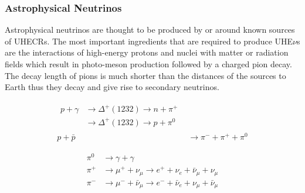 \subsubsection*{Astrophysical Neutrinos}
\label{subsubsec:AstroNu}

Astrophysical neutrinos are thought to be produced by or around known sources of \glspl{UHECR}. The most important ingredients that are required to produce UHE$\nu$s are the interactions of high-energy protons and nuclei with matter or radiation fields which result in photo-meson production followed by a charged pion decay. The decay length of pions is much shorter than the distances of the sources to Earth thus they decay and give rise to secondary neutrinos. 

\begin{subequations}\label{eq:Nuprod_1}
  \begin{align}
    \begin{split}
      p + \gamma &\longrightarrow \Delta^+(1232 ) \longrightarrow n+\pi^+ \\ 
                      &\longrightarrow \Delta^+(1232 ) \longrightarrow p+\pi^0
    \end{split} \\
      p + \bar{p} &\longrightarrow \pi^- + \pi^+ + \pi^0 
  \end{align}
\end{subequations}

\begin{subequations}\label{eq:Nuprod_2}
  \begin{align}  
    \pi^0 &\longrightarrow \gamma + \gamma \\
    \pi^+ &\longrightarrow \mu^+ + \nu_{\mu} \longrightarrow e^+ + \nu_{e} + \bar{\nu}_{\mu} + \nu_{\mu} \\
    \pi^- &\longrightarrow \mu^- + \bar{\nu}_{\mu} \longrightarrow e^- + \bar{\nu}_{e} + \nu_{\mu} + \bar{\nu}_{\mu}
  \end{align}
\end{subequations}

